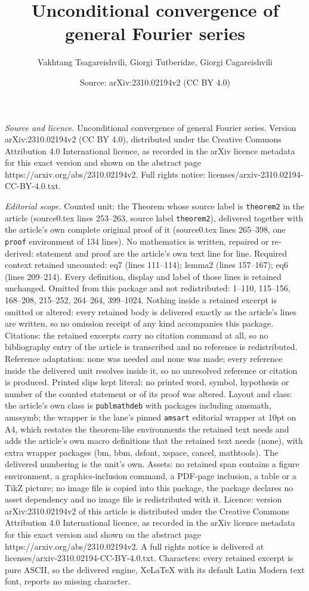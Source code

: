 \documentclass[10pt,a4paper]{amsart}
\title[Unconditional convergence of general Fourier series]{Unconditional convergence of general Fourier series}
\author{Vakhtang Tsagareishvili, Giorgi Tutberidze, Giorgi Cagareishvili}
\date{Source: arXiv:2310.02194v2 (CC BY 4.0)}
\begin{document}
\maketitle

\noindent\emph{Source and licence.} Unconditional convergence of general Fourier series. Version arXiv:2310.02194v2 (CC BY 4.0), distributed under the Creative Commons Attribution 4.0 International licence, as recorded in the arXiv licence metadata for this exact version and shown on the abstract page https://arxiv.org/abs/2310.02194v2. Full rights notice: licenses/arxiv-2310.02194-CC-BY-4.0.txt.\par\smallskip

\noindent\textit{Editorial scope.} Counted unit: the Theorem whose source label is \texttt{theorem2} in the article (source0.tex lines 253--263, source label \texttt{theorem2}), delivered together with the article's own complete original proof of it (source0.tex lines 265--398, one \texttt{proof} environment of 134 lines). No mathematics is written, repaired or re-derived: statement and proof are the article's own text line for line. Required context retained uncounted: eq7 (lines 111--114); lemma2 (lines 157--167); eq6 (lines 209--214). Every definition, display and label of those lines is retained unchanged. Omitted from this package and not redistributed: 1--110, 115--156, 168--208, 215--252, 264--264, 399--1024. Nothing inside a retained excerpt is omitted or altered: every retained body is delivered exactly as the article's lines are written, so no omission receipt of any kind accompanies this package. Citations: the retained excerpts carry no citation command at all, so no bibliography entry of the article is transcribed and no reference is redistributed. Reference adaptation: none was needed and none was made; every reference inside the delivered unit resolves inside it, so no unresolved reference or citation is produced. Printed slips kept literal: no printed word, symbol, hypothesis or number of the counted statement or of its proof was altered. Layout and class: the article's own class is \texttt{publmathdeb} with packages including amsmath, amssymb; the wrapper is the lane's pinned \texttt{amsart} editorial wrapper at 10pt on A4, which restates the theorem-like environments the retained text needs and adds the article's own macro definitions that the retained text needs (none), with extra wrapper packages (bm, bbm, dsfont, xspace, cancel, mathtools). The delivered numbering is the unit's own. Assets: no retained span contains a figure environment, a graphics-inclusion command, a PDF-page inclusion, a table or a TikZ picture; no image file is copied into this package, the package declares no asset dependency and no image file is redistributed with it. Licence: version arXiv:2310.02194v2 of this article is distributed under the Creative Commons Attribution 4.0 International licence, as recorded in the arXiv licence metadata for this exact version and shown on the abstract page https://arxiv.org/abs/2310.02194v2. A full rights notice is delivered at licenses/arxiv-2310.02194-CC-BY-4.0.txt. Characters: every retained excerpt is pure ASCII, so the delivered engine, XeLaTeX with its default Latin Modern text font, reports no missing character.
\end{document}
